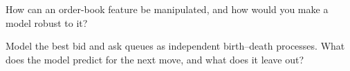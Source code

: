 \begin{interviewq}\label{iq:rs:order-book-features:5}
How can an order-book feature be manipulated, and how would you make a model robust to it?
\end{interviewq}

\begin{interviewq}\label{iq:rs:order-book-features:6}
Model the best bid and ask queues as independent birth--death processes. What does the model predict for the next move, and what does it
leave out?
\end{interviewq}

